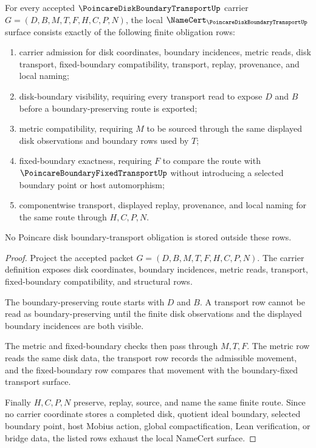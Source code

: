 \begin{theorem}
\label{thm:poincare-disk-boundary-transport-namecert-obligations}
For every accepted $\PoincareDiskBoundaryTransportUp$ carrier $G=(D,B,M,T,F,H,C,P,N)$, the local $\NameCert_{\PoincareDiskBoundaryTransportUp}$ surface consists exactly of the following finite obligation rows:
\begin{enumerate}
\item carrier admission for disk coordinates, boundary incidences, metric reads, disk transport, fixed-boundary compatibility, transport, replay, provenance, and local naming;
\item disk-boundary visibility, requiring every transport read to expose $D$ and $B$ before a boundary-preserving route is exported;
\item metric compatibility, requiring $M$ to be sourced through the same displayed disk observations and boundary rows used by $T$;
\item fixed-boundary exactness, requiring $F$ to compare the route with $\PoincareBoundaryFixedTransportUp$ without introducing a selected boundary point or host automorphism;
\item componentwise transport, displayed replay, provenance, and local naming for the same route through $H,C,P,N$.
\end{enumerate}
No Poincare disk boundary-transport obligation is stored outside these rows.
\end{theorem}
\begin{proof}
Project the accepted packet $G=(D,B,M,T,F,H,C,P,N)$. The carrier definition exposes disk coordinates, boundary incidences, metric reads, transport, fixed-boundary compatibility, and structural rows.

The boundary-preserving route starts with $D$ and $B$. A transport row cannot be read as boundary-preserving until the finite disk observations and the displayed boundary incidences are both visible.

The metric and fixed-boundary checks then pass through $M,T,F$. The metric row reads the same disk data, the transport row records the admissible movement, and the fixed-boundary row compares that movement with the boundary-fixed transport surface.

Finally $H,C,P,N$ preserve, replay, source, and name the same finite route. Since no carrier coordinate stores a completed disk, quotient ideal boundary, selected boundary point, host Mobius action, global compactification, Lean verification, or bridge data, the listed rows exhaust the local NameCert surface.
\end{proof}

